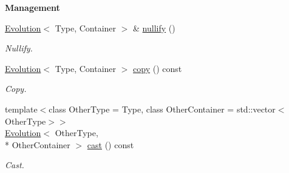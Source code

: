 \begin{Indent}{\bf Management}\par
\begin{DoxyCompactItemize}
\item 
\hyperlink{exceptionmagrathea_1_1Evolution}{Evolution}$<$ Type, Container $>$ \& \hyperlink{exceptionmagrathea_1_1Evolution_ad91adfe2a3a30902c4e8a7ccd666d038}{nullify} ()
\begin{DoxyCompactList}\small\item\em Nullify. \end{DoxyCompactList}\item 
\hyperlink{exceptionmagrathea_1_1Evolution}{Evolution}$<$ Type, Container $>$ \hyperlink{exceptionmagrathea_1_1Evolution_aab68c32b93a1cfc959a20624e82e7955}{copy} () const 
\begin{DoxyCompactList}\small\item\em Copy. \end{DoxyCompactList}\item 
{\footnotesize template$<$class Other\-Type  = Type, class Other\-Container  = std\-::vector$<$\-Other\-Type$>$$>$ }\\\hyperlink{exceptionmagrathea_1_1Evolution}{Evolution}$<$ Other\-Type, \\*
Other\-Container $>$ \hyperlink{exceptionmagrathea_1_1Evolution_aceb8dcc079d955d728af45e8d2086995}{cast} () const 
\begin{DoxyCompactList}\small\item\em Cast. \end{DoxyCompactList}\end{DoxyCompactItemize}
\end{Indent}
